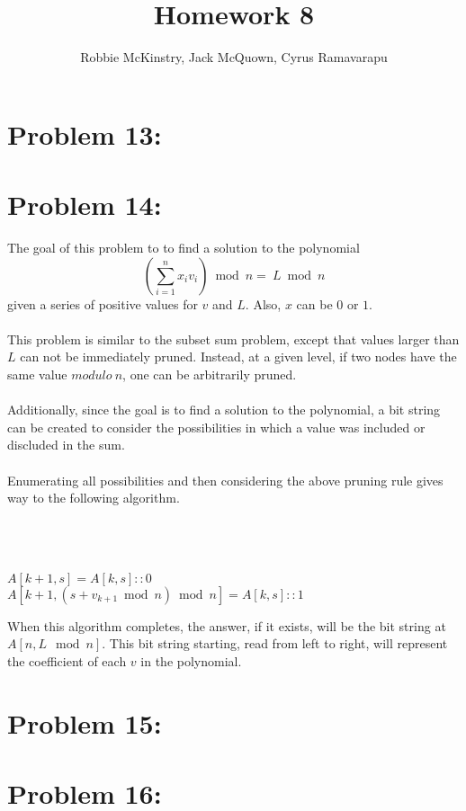 \documentclass[12pt]{article}
\begin{document}
\title{Homework 8}
\author{Robbie McKinstry, Jack McQuown, Cyrus Ramavarapu}
\renewcommand{\today}{21 September 2016}
\renewcommand{\baselinestretch}{1.5}
\maketitle

\section*{Problem 13: }
\section*{Problem 14: }
The goal of this problem to to find a 
solution to the polynomial \[\left(\sum_{i=1}^{n}x_iv_i\right)\bmod n=\ L\bmod n\]
given a series of positive values for $v$ and $L$.  Also, $x$
can be $0$ or $1$.\\\\  
This problem is similar to the subset sum problem, except that
values larger than $L$ can not be immediately pruned.
Instead, at a given level, if two nodes have the same value 
$modulo\ n$, one can be arbitrarily pruned.\\\\
Additionally, since the goal is to find a solution to the
polynomial, a bit string can be created to consider the
possibilities in which a value was included or discluded in
the sum.\\\\
Enumerating all possibilities and then considering the 
above pruning rule gives way to the following algorithm.\\\\
\begin{algorithm}[H]
\\
\\
{
{
{
   $A[k+1,s] = A[k,s]::0$\\
   $A[k+1, (s + v_{k+1}\bmod n)\bmod n] = A[k,s]::1$\\
}
}
}
\end{algorithm}
When this algorithm completes, the answer, if it exists,
will be the bit string at $A[n,L\mod n]$.  This bit string
starting, read from left to right, will represent the 
coefficient of each $v$ in the polynomial.
\section*{Problem 15: }
\section*{Problem 16: }
\end{document}
